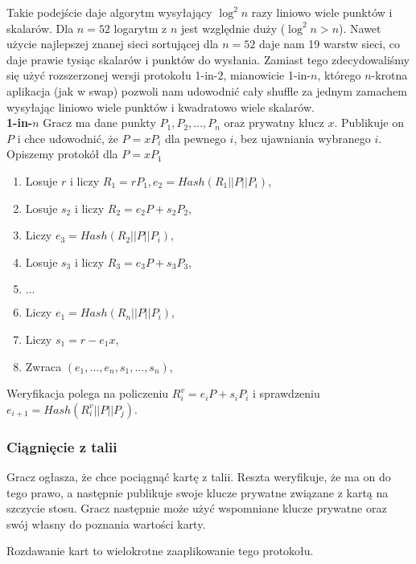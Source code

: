 \documentclass{article}
\begin{document}
Takie podejście daje algorytm wysyłający $\log^2{n}$ razy liniowo wiele punktów i skalarów. Dla $n = 52$ logarytm z $n$ jest względnie duży ($\log^2{n} > n$). Nawet użycie najlepszej znanej sieci sortującej dla $n=52$ daje nam 19 warstw sieci, co daje prawie tysiąc skalarów i punktów do wysłania. Zamiast tego zdecydowaliśmy się użyć rozszerzonej wersji protokołu 1-in-2, mianowicie 1-in-$n$, którego $n$-krotna aplikacja (jak w swap) pozwoli nam udowodnić cały shuffle za jednym zamachem wysyłając liniowo wiele punktów i kwadratowo wiele skalarów.
\\

\noindent \textbf{1-in-$n$} Gracz ma dane punkty $P_1,P_2,\ldots,P_n$ oraz prywatny klucz $x$. Publikuje on $P$ i chce udowodnić, że $P = xP_i$ dla pewnego $i$, bez ujawniania wybranego $i$.
\\

\noindent Opiszemy protokół dla $P = xP_1$
\noindent \begin{enumerate}
    \item Losuje $r$ i liczy $R_1 = rP_1, e_2 = Hash(R_1 || P || P_i)$,
    \item Losuje $s_2$ i liczy $R_2 = e_2P + s_2P_2$,
    \item Liczy $e_3 = Hash(R_2 || P || P_i)$,
    \item Losuje $s_3$ i liczy $R_3 = e_3P + s_3P_3$,
    \item $\ldots$
    \item Liczy $e_1 = Hash(R_n || P || P_i)$,
    \item Liczy $s_1 = r - e_1x$,
    \item Zwraca $(e_1,\ldots,e_n,s_1,\ldots,s_n)$,
\end{enumerate}

\noindent Weryfikacja polega na policzeniu $R_i^v = e_iP + s_iP_i$ i sprawdzeniu $e_{i + 1} = Hash(R_i^v || P || P_j)$.

\subsubsection{Ciągnięcie z talii}

Gracz ogłasza, że chce pociągnąć kartę z talii. Reszta weryfikuje, że ma on do tego prawo, a następnie publikuje swoje klucze prywatne związane z kartą na szczycie stosu. Gracz następnie może użyć wspomniane klucze prywatne oraz swój własny do poznania wartości karty.

Rozdawanie kart to wielokrotne zaaplikowanie tego protokołu.
\end{document}
